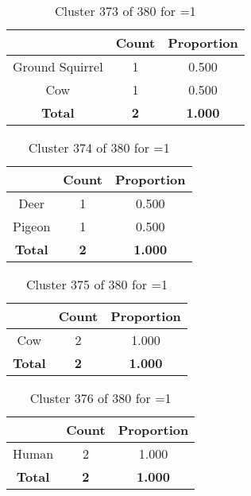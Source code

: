 \begin{table}[ht!]
\centering
\begin{tabular}{|c|c|c|}
\hline
\bf \Spec{} &\bf Count &\bf Proportion\\ \hline \hline
Ground Squirrel & 1 & 0.500\\ \hline
Cow & 1 & 0.500\\ \hline
\hline
\bf Total & \bf 2 & \bf 1.000\\ \hline
\end{tabular}
\label{tab:cluster:373:1}
\caption{Cluster 373 of 380 for \minneigh{}=1}
\end{table}

\begin{table}[ht!]
\centering
\begin{tabular}{|c|c|c|}
\hline
\bf \Spec{} &\bf Count &\bf Proportion\\ \hline \hline
Deer & 1 & 0.500\\ \hline
Pigeon & 1 & 0.500\\ \hline
\hline
\bf Total & \bf 2 & \bf 1.000\\ \hline
\end{tabular}
\label{tab:cluster:374:1}
\caption{Cluster 374 of 380 for \minneigh{}=1}
\end{table}

\begin{table}[ht!]
\centering
\begin{tabular}{|c|c|c|}
\hline
\bf \Spec{} &\bf Count &\bf Proportion\\ \hline \hline
Cow & 2 & 1.000\\ \hline
\hline
\bf Total & \bf 2 & \bf 1.000\\ \hline
\end{tabular}
\label{tab:cluster:375:1}
\caption{Cluster 375 of 380 for \minneigh{}=1}
\end{table}

\begin{table}[ht!]
\centering
\begin{tabular}{|c|c|c|}
\hline
\bf \Spec{} &\bf Count &\bf Proportion\\ \hline \hline
Human & 2 & 1.000\\ \hline
\hline
\bf Total & \bf 2 & \bf 1.000\\ \hline
\end{tabular}
\label{tab:cluster:376:1}
\caption{Cluster 376 of 380 for \minneigh{}=1}
\end{table}

